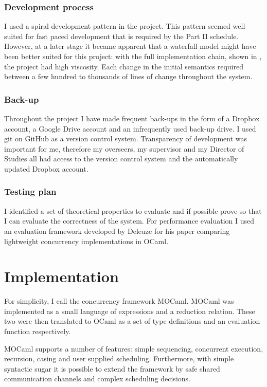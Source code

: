 \documentclass[12pt,twoside,notitlepage]{report}
\theoremstyle{plain}%
\theoremstyle{definition}
\theoremstyle{remark}
\begin{document}
\subsection{Development process}
I used a spiral development pattern in the project. This pattern seemed well suited for fast paced development that is required by the Part II schedule. However, at a later stage it became apparent that a waterfall model might have been better suited for this project: with the full implementation chain, shown in , the project had high viscosity. Each change in the initial semantics required between a few hundred to thousands of lines of change throughout the system. 
\subsection{Back-up}
Throughout the project I have made frequent back-ups in the form of a Dropbox account, a Google Drive account and an infrequently used back-up drive. I used git on GitHub as a version control system. Transparency of development was important for me, therefore my overseers, my supervisor and my Director of Studies all had access to the version control system and the automatically updated Dropbox account.
\subsection{Testing plan}
I identified a set of theoretical properties to evaluate and if possible prove so that I can evaluate the correctness of the system. For performance evaluation I used an evaluation framework developed by Deleuze for his paper comparing lightweight concurrency implementations in OCaml\cite{deleuzelight}.

\cleardoublepage
\chapter{Implementation}
For simplicity, I call the concurrency framework MOCaml. MOCaml was implemented as a small language of expressions and a reduction relation.  These two were then translated to OCaml as a set of type definitions and an evaluation function respectively. 

MOCaml supports a number of features: simple sequencing, concurrent execution, recursion, casing and user supplied scheduling. Furthermore, with simple syntactic sugar it is possible to extend the framework by safe shared communication channels and complex scheduling decisions. 
\end{document}
